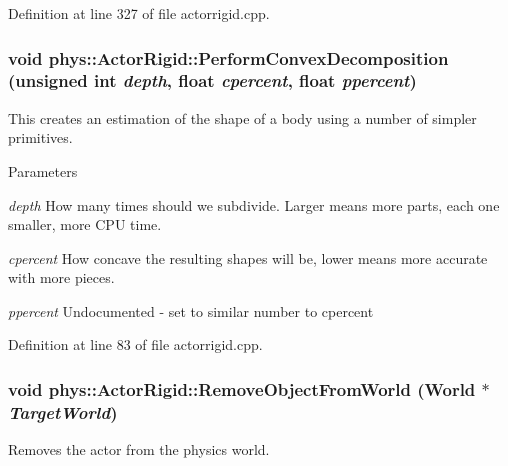 Definition at line 327 of file actorrigid.cpp.

\hypertarget{classphys_1_1ActorRigid_a63aac7ce099716928f7b9f4c6ef40453}{
\subsubsection[{PerformConvexDecomposition}]{\setlength{\rightskip}{0pt plus 5cm}void phys::ActorRigid::PerformConvexDecomposition (unsigned int {\em depth}, \/  float {\em cpercent}, \/  float {\em ppercent})}}
\label{d8/d71/classphys_1_1ActorRigid_a63aac7ce099716928f7b9f4c6ef40453}


This creates an estimation of the shape of a body using a number of simpler primitives. 


\begin{DoxyParams}{Parameters}
\item[{\em depth}]How many times should we subdivide. Larger means more parts, each one smaller, more CPU time. \item[{\em cpercent}]How concave the resulting shapes will be, lower means more accurate with more pieces. \item[{\em ppercent}]Undocumented -\/ set to similar number to cpercent \end{DoxyParams}


Definition at line 83 of file actorrigid.cpp.

\hypertarget{classphys_1_1ActorRigid_a7101df2a149e0ccb3678b7c2c00998f8}{
\subsubsection[{RemoveObjectFromWorld}]{\setlength{\rightskip}{0pt plus 5cm}void phys::ActorRigid::RemoveObjectFromWorld ({\bf World} $\ast$ {\em TargetWorld})}}
\label{d8/d71/classphys_1_1ActorRigid_a7101df2a149e0ccb3678b7c2c00998f8}


Removes the actor from the physics world. 

